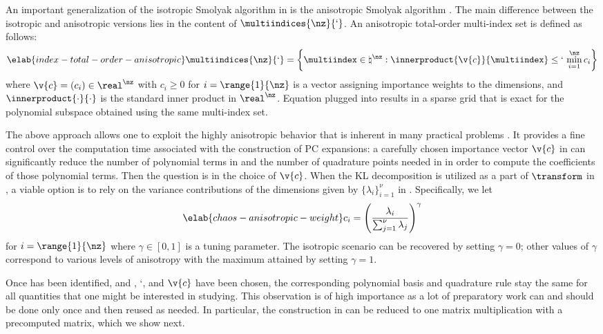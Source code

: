 An important generalization of the isotropic Smolyak algorithm in
 is the anisotropic Smolyak algorithm
\cite{nobile2008}. The main difference between the isotropic and anisotropic
versions lies in the content of $\multiindices{\nz}{\lq}$. An anisotropic
total-order multi-index set is defined as follows:
\begin{equation} \elab{index-total-order-anisotropic}
  \multiindices{\nz}{\lq} = \left\{ \multiindex \in \natural^\nz: \innerproduct{\v{c}}{\multiindex} \leq \lq \, \min_{i = 1}^\nz c_i \right\}
\end{equation}
where $\v{c} = (c_i) \in \real^\nz$ with $c_i \geq 0$ for $i = \range{1}{\nz}$
is a vector assigning importance weights to the dimensions, and
$\innerproduct{\cdot}{\cdot}$ is the standard inner product in $\real^\nz$.
Equation  plugged into
 results in a sparse grid that is exact for the
polynomial subspace obtained using the same multi-index set.

The above approach allows one to exploit the highly anisotropic behavior that is
inherent in many practical problems \cite{nobile2008}. It provides a fine
control over the computation time associated with the construction of \ac{PC}
expansions: a carefully chosen importance vector $\v{c}$ in
 can significantly reduce the number of
polynomial terms in  and the number of quadrature points
needed in  in order to compute the coefficients of those
polynomial terms. Then the question is in the choice of $\v{c}$. When the
\ac{KL} decomposition is utilized as a part of $\transform$ in
, a viable option is to rely on the variance
contributions of the dimensions given by $\{ \lambda_i \}_{i = 1}^\nu$ in
. Specifically, we let
\begin{equation} \elab{chaos-anisotropic-weight}
  c_i = \left(\frac{\lambda_i}{\sum_{j = 1}^\nu \lambda_j}\right)^\gamma
\end{equation}
for $i = \range{1}{\nz}$ where $\gamma \in [0, 1]$ is a tuning parameter. The
isotropic scenario can be recovered by setting $\gamma = 0$; other values of
$\gamma$ correspond to various levels of anisotropy with the maximum attained by
setting $\gamma = 1$.

Once \vz has been identified, and \lc, \lq, and $\v{c}$ have been chosen, the
corresponding polynomial basis and quadrature rule stay the same for all
quantities that one might be interested in studying. This observation is of high
importance as a lot of preparatory work can and should be done only once and
then reused as needed. In particular, the construction in 
can be reduced to one matrix multiplication with a precomputed matrix, which we
show next.

